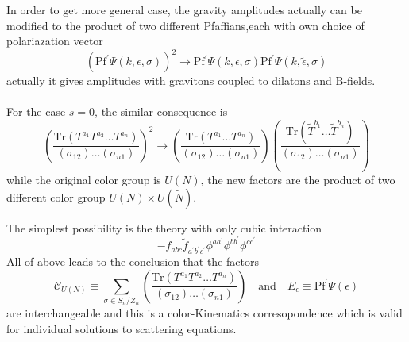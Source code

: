 \documentclass{beamer}
\begin{document}
\begin{frame}
    In order to get more general case, the gravity amplitudes actually can be modified to the product of two different Pfaffians,each with own choice of polariazation vector
    \begin{equation*}
        \left(\mathrm{Pf}^\prime \Psi(k,\epsilon,\sigma)\right)^2\to\mathrm{Pf}^\prime \Psi(k,\epsilon,\sigma)\mathrm{Pf}^\prime \Psi(k,\tilde{\epsilon},\sigma)
    \end{equation*}
    actually it gives amplitudes with gravitons coupled to dilatons and B-fields.
    \\ \hspace*{\fill}\\
    For the case $s=0$, the similar consequence is 
    \begin{equation*}
        \left(\frac{\mathrm{Tr}(T^{a_1}T^{a_2}\dots T^{a_n})}{(\sigma_{12})\dots (\sigma_{n1})}\right)^2\to\left(\frac{\mathrm{Tr}(T^{a_1}\dots T^{a_n})}{(\sigma_{12})\dots (\sigma_{n1})}\right)
        \left(\frac{\mathrm{Tr}(\tilde{T}^{b_1}\dots \tilde{T}^{b_n})}{(\sigma_{12})\dots (\sigma_{n1})}\right)
    \end{equation*}
    while the original color group is $U(N)$, the new factors are the product of two different color group \alert{$U(N)\times U(\tilde{N})$}.
\end{frame}
\begin{frame}
    The simplest possibility is the theory with only cubic interaction
    \begin{equation*}
        -f_{abc}\tilde{f}_{a^\prime b^\prime c^\prime}\phi^{aa^\prime}\phi^{bb^\prime}\phi^{cc^\prime}
    \end{equation*}
    All of above leads to the conclusion that the factors 
    \begin{equation*}
        \mathcal{C}_{U(N)}\equiv \sum_{\sigma\in S_n/Z_n}\left(\frac{\mathrm{Tr}(T^{a_1}T^{a_2}\dots T^{a_n})}{(\sigma_{12})\dots (\sigma_{n1})}\right)\quad \mathrm{and} \quad E_\epsilon\equiv\mathrm{Pf}^{'}\Psi(\epsilon)
    \end{equation*}
    are interchangeable and this is a color-Kinematics corresopondence which is valid for individual solutions to scattering equations.
   
\end{frame}
\end{document}
